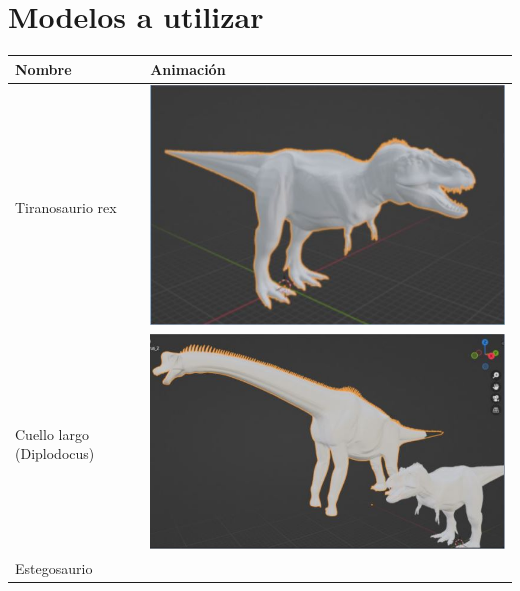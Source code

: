 \documentclass[12pt]{article} %
\begin{document}
	
	\newpage
	
	\section{Modelos a utilizar}
	
	\begin{center}
		\begin{tabular}{ | m{19em} | m{19em} | }
			\hline
			\rowcolor[rgb]{0.6,0.8,1.0}
			\textbf{Nombre} & \textbf{Animación}  \\ 
			\hline
			\hline
			\rowcolor[rgb]{0.4,0.6,1.0}
		 	Tiranosaurio rex &
		 	\includegraphics[scale=0.5]{images/Tiranosaurio.JPG} \\  
		 	\hline
		 	\rowcolor[rgb]{0.6,0.8,1.0}
		 	Cuello largo (Diplodocus) &
		 	\includegraphics[scale=0.5]{images/Diplodocus.JPG} \\
		 	\hline
		 	\rowcolor[rgb]{0.4,0.6,1.0}
		 	Estegosaurio &

\end{tabular}
\end{center}
\end{document}

